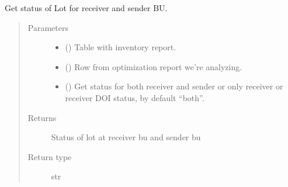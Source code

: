 \documentclass[letterpaper,10pt,english]{sphinxmanual}
\begin{document}
\begin{fulllineitems}
\label{\detokenize{source/optimization.datatools:optimization.datatools.extra_output.get_status}}
Get status of Lot for receiver and sender BU.
\begin{quote}\begin{description}
\item[{Parameters}] \leavevmode\begin{itemize}
\item {} 
 () \textendash{} Table with inventory report.

\item {} 
 () \textendash{} Row from optimization report we’re analyzing.

\item {} 
 (\sphinxstyleliteralemphasis{\sphinxupquote{, }}) \textendash{} Get status for both receiver and sender or only receiver or receiver DOI status, by default “both”.

\end{itemize}

\item[{Returns}] \leavevmode
Status of lot at receiver bu and sender bu

\item[{Return type}] \leavevmode
str

\end{description}\end{quote}

\end{fulllineitems}

\end{document}
